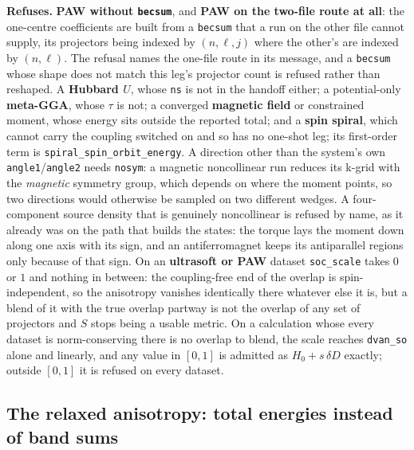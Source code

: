 \documentclass[11pt,a4paper]{article}
\newcommand{\code}[1]{\texttt{\small #1}}
\begin{document}
\begin{refuses}
\textbf{Refuses.} \textbf{PAW without \code{becsum}}, and \textbf{PAW on the
two-file route at all}: the one-centre coefficients are built from a
\code{becsum} that a run on the other file cannot supply, its projectors being
indexed by $(n,\ell,j)$ where the other's are indexed by $(n,\ell)$. The
refusal names the one-file route in its message, and a \code{becsum} whose
shape does not match this leg's projector count is refused rather than
reshaped. A \textbf{Hubbard $U$}, whose \code{ns} is not in the handoff either; a
potential-only \textbf{meta-GGA}, whose $\tau$ is not; a converged
\textbf{magnetic field} or constrained moment, whose energy sits outside the
reported total; and a \textbf{spin spiral}, which cannot carry the coupling
switched on and so has no one-shot leg; its first-order term is
\code{spiral\_spin\_orbit\_energy}. A direction other than the
system's own \code{angle1}/\code{angle2} needs \code{nosym}: a magnetic
noncollinear run reduces its k-grid with the \emph{magnetic} symmetry group,
which depends on where the moment points, so two directions would otherwise be
sampled on two different wedges. A four-component source density that is
genuinely noncollinear is refused by name, as it already was on the path that
builds the states: the torque lays the moment down along one axis with its
sign, and an antiferromagnet keeps its antiparallel regions only because of
that sign. On an \textbf{ultrasoft or PAW} dataset \code{soc\_scale} takes
$0$ or $1$ and nothing in between: the coupling-free end of the overlap is
spin-independent, so the anisotropy vanishes identically there whatever else it
is, but a blend of it with the true overlap partway is not the overlap of any
set of projectors and $S$ stops being a usable metric. On a calculation whose
every dataset is norm-conserving there is no overlap to blend, the scale reaches
\code{dvan\_so} alone and linearly, and any value in $[0, 1]$ is admitted as
$H_0 + s\,\delta D$ exactly; outside $[0, 1]$ it is refused on every dataset.
\end{refuses}

\subsection{The relaxed anisotropy: total energies instead of band sums}
\end{document}
